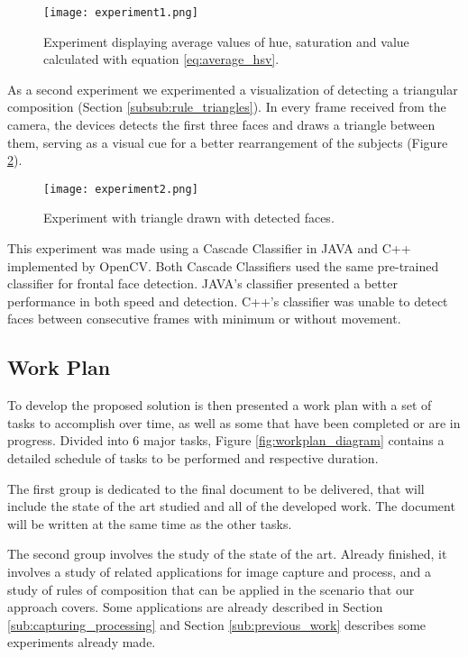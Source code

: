 \begin{figure}[htbp]
    \centering
    \texttt{[image: experiment1.png]}
	\caption{Experiment displaying average values of hue, saturation and value calculated with equation \ref{eq:average_hsv}\cite{datta2006studying}.}
	\label{fig:experiment1}
\end{figure}

As a second experiment we experimented a visualization of detecting a triangular composition (Section \ref{subsub:rule_triangles}). In every frame received from the camera, the devices detects the first three faces and draws a triangle between them, serving as a visual cue for a better rearrangement of the subjects (Figure \ref{fig:experiment2}).

\begin{figure}[htbp]
    \centering
    \texttt{[image: experiment2.png]}
	\caption{Experiment with triangle drawn with detected faces.}
	\label{fig:experiment2}
\end{figure}

This experiment was made using a Cascade Classifier in JAVA and C++ implemented by OpenCV. Both Cascade Classifiers used the same pre-trained classifier for frontal face detection. JAVA's classifier presented a better performance in both speed and detection. C++'s classifier was unable to detect faces between consecutive frames with minimum or without movement.

\subsection{Work Plan}
\label{sub:work_plan}

To develop the proposed solution is then presented a work plan with a set of tasks to accomplish over time, as well as some that have been completed or are in progress. Divided into 6 major tasks, Figure \ref{fig:workplan_diagram} contains a detailed schedule of tasks to be performed and respective duration.

The first group is dedicated to the final document to be delivered, that will include the state of the art studied and all of the developed work. The document will be written at the same time as the other tasks.

The second group involves the study of the state of the art. Already finished, it involves a study of related applications for image capture and process, and a study of rules of composition that can be applied in the scenario that our approach covers. Some applications are already described in Section \ref{sub:capturing_processing} and Section \ref{sub:previous_work} describes some experiments already made.

